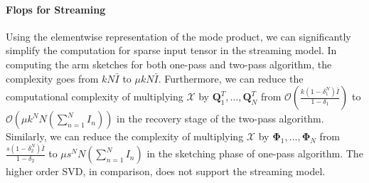 \paragraph{Flops for Streaming} Using the elementwise representation of the mode product, we can significantly simplify the computation for sparse input tensor in the streaming model. In computing the arm sketches for both one-pass and two-pass algorithm, the complexity goes from $kN\bar{I}$ to $\mu kN\bar{I}$. Furthermore, we can reduce the computational complexity of multiplying $\mathscr{X}$ by $\mathbf{Q}_1^T, \dots, \mathbf{Q}_N^T$ from $\mathscr{O}(\frac{k(1-\delta_1^N)\bar{I}}{1-\delta_1})$ to $\mathscr{O}(\mu k^N N(\sum_{n =1}^N I_n ))$ in the recovery stage of the two-pass algorithm. Similarly, we can reduce the complexity of multiplying $\mathscr{X}$ by $\mathbf{\Phi}_1, \dots, \mathbf{\Phi}_N$ from $\frac{s(1-\delta_2^N)\bar{I}}{1-\delta_2}$ to $\mu s^NN(\sum_{n=1}^NI_n)$ in the sketching phase of one-pass algorithm. The higher order SVD, in comparison, does not support the streaming model. 
